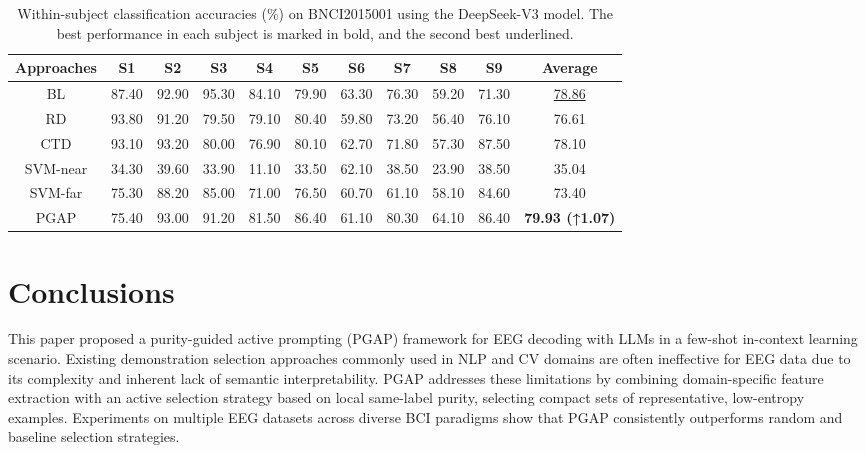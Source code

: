 \documentclass[journal,twocolumn]{IEEEtran}
\begin{document}
\begin{table}[htpb] \centering
  \caption{Within-subject classification accuracies (\%) on BNCI2015001 using the DeepSeek-V3 model. The best performance in each subject is marked in bold, and the second best underlined.}
  \label{tab:deepseek-result}
  \begin{tabular}{c|c|c|c|c|c|c|c|c|c|c}
  \toprule
  Approaches & S1 & S2 & S3 & S4 & S5 & S6 & S7 & S8 & S9 & Average \\
  \midrule
  BL & 87.40 & 92.90 & 95.30 & 84.10 & 79.90 & 63.30 & 76.30 & 59.20 & 71.30 & \underline{78.86} \\
  RD & 93.80 & 91.20 & 79.50 & 79.10 & 80.40 & 59.80 & 73.20 & 56.40 & 76.10 & 76.61 \\
  CTD & 93.10 & 93.20 & 80.00 & 76.90 & 80.10 & 62.70 & 71.80 & 57.30 & 87.50 & 78.10 \\
  SVM-near & 34.30 & 39.60 & 33.90 & 11.10 & 33.50 & 62.10 & 38.50 & 23.90 & 38.50 & 35.04 \\
  SVM-far & 75.30 & 88.20 & 85.00 & 71.00 & 76.50 & 60.70 & 61.10 & 58.10 & 84.60 & 73.40 \\
  PGAP & 75.40 & 93.00 & 91.20 & 81.50 & 86.40 & 61.10 & 80.30 & 64.10 & 86.40 & \textbf{79.93 (↑1.07)} \\
  \bottomrule
  \end{tabular}
\end{table}

\section{Conclusions}\label{sec:conclusion}
This paper proposed a purity-guided active prompting (PGAP) framework for EEG decoding with LLMs in a few-shot in-context learning scenario. Existing demonstration selection approaches commonly used in NLP and CV domains are often ineffective for EEG data due to its complexity and inherent lack of semantic interpretability. PGAP addresses these limitations by combining domain-specific feature extraction with an active selection strategy based on local same-label purity, selecting compact sets of representative, low-entropy examples. Experiments on multiple EEG datasets across diverse BCI paradigms show that PGAP consistently outperforms random and baseline selection strategies.


\end{document}
